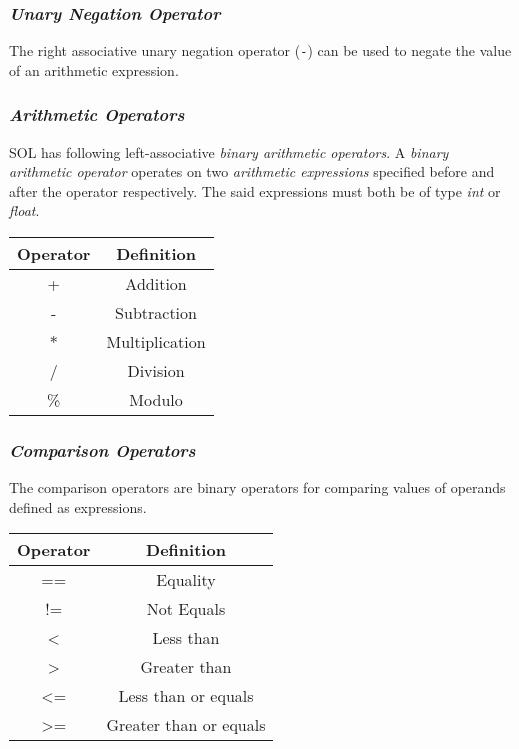 \documentclass[letterpaper,12pt]{article}
\begin{document}
        \subsubsection{\textit{Unary Negation Operator}} \label{negation}
        The right associative unary negation operator (\texttt{-}) can be used to negate the value of an arithmetic expression.

        \subsubsection{\textit{Arithmetic Operators}}
        SOL has following left-associative \textit{binary arithmetic operators}. A \textit{binary arithmetic operator} operates on two \textit{arithmetic expressions} specified before and after the operator respectively. The said expressions must both be of type \textit{int} or \textit{float}.

            \begin{center}
                \begin{tabular}{ |c|c| }
                \hline
                    \textbf{Operator} & \textbf{Definition} \\
                    \hline
                    +   &   Addition\\
                    -   &   Subtraction\\
                    $*$   &   Multiplication\\
                    /   &   Division\\
                    \%  &   Modulo\\
                \hline
                \end{tabular}
            \end{center}

        \subsubsection{\textit{Comparison Operators}}
        The comparison operators are binary operators for comparing values of operands defined as expressions.
            \begin{center}
                \begin{tabular}{ |c|c| }
                \hline
                    \textbf{Operator} & \textbf{Definition} \\
                    \hline
                    ==  			& Equality \\
                    !=  			& Not Equals \\
                    \textless		& Less than \\
                    \textgreater	& Greater than \\
                    \textless=		& Less than or equals \\
                    \textgreater=	& Greater than or equals \\
                \hline
                \end{tabular}
            \end{center}
        
\end{document}
